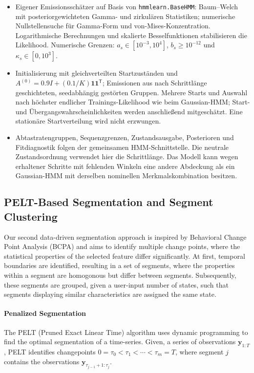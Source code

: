 \begin{itemize}
    \item Eigener Emissionsschätzer auf Basis von \texttt{hmmlearn.BaseHMM}: Baum--Welch mit posteriorgewichteten Gamma- und zirkulären Statistiken; numerische Nullstellensuche für Gamma-Form und von-Mises-Konzentration. Logarithmische Berechnungen und skalierte Besselfunktionen stabilisieren die Likelihood. Numerische Grenzen: $a_s\in[10^{-3},10^4]$, $b_s\geq10^{-12}$ und $\kappa_s\in[0,10^3]$.
    \item Initialisierung mit gleichverteilten Startzuständen und $A^{(0)}=0.9I+(0.1/K)\mathbf{1}\mathbf{1}^{\mathsf T}$; Emissionen aus nach Schrittlänge geschichteten, seedabhängig gestörten Gruppen. Mehrere Starts und Auswahl nach höchster endlicher Trainings-Likelihood wie beim Gaussian-HMM; Start- und Übergangswahrscheinlichkeiten werden anschließend mitgeschätzt. Eine stationäre Startverteilung wird nicht erzwungen.
    \item Abtastratengruppen, Sequenzgrenzen, Zustandsausgabe, Posterioren und Fitdiagnostik folgen der gemeinsamen HMM-Schnittstelle. Die neutrale Zustandsordnung verwendet hier die Schrittlänge. Das Modell kann wegen erhaltener Schritte mit fehlenden Winkeln eine andere Abdeckung als ein Gaussian-HMM mit derselben nominellen Merkmalskombination besitzen.
\end{itemize}

\subsection{PELT-Based Segmentation and Segment Clustering}
\label{subsec:pelt}
Our second data-driven segmentation approach is inspired by Behavioral Change Point Analysis (BCPA) and aims to identify
multiple change points, where the statistical properties of the selected feature differ significantly.
At first, temporal boundaries are identified, resulting in a set of segments, where the properties within a segment are homogonous but differ between segments.
Subsequently, these segments are grouped, given a user-input number of states, such that segments displaying similar characteristics
are assigned the same state.

\paragraph{Penalized Segmentation}
The PELT (Pruned Exact Linear Time) algorithm uses dynamic programming to find the optimal segmentation of a time-series.
Given, a series of observations $\mathbf{y}_{1:T}$, PELT identifies changepoints $0=\tau_0<\tau_1<\cdots<\tau_m=T$, where segment
$j$ contains the observations $\mathbf y_{\tau_{j-1}+1:\tau_j}$.

